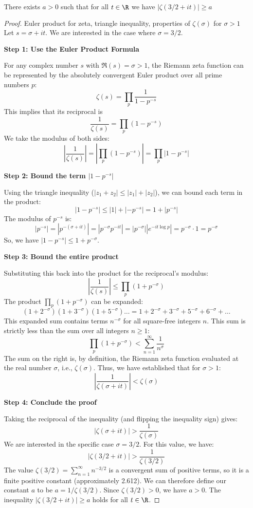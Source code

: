 \begin{lemma}\label{lem:zeta32lower}
\leanok
There exists $a>0$ such that for all $t\in\R$ we have $|\zeta(3/2+it)| \ge a$
\end{lemma}
\begin{proof}
\leanok
{}
Euler product for zeta, triangle inequality, properties of $\zeta(\sigma)$ for $\sigma>1$
Let $s = \sigma + it$. We are interested in the case where $\sigma = 3/2$.

\textbf{Step 1: Use the Euler Product Formula}

For any complex number $s$ with $\Re(s) = \sigma > 1$, the Riemann zeta function can be represented by the absolutely convergent Euler product over all prime numbers $p$:
$$ \zeta(s) = \prod_{p} \frac{1}{1-p^{-s}} $$
This implies that its reciprocal is
$$ \frac{1}{\zeta(s)} = \prod_{p} (1-p^{-s}) $$
We take the modulus of both sides:
$$ \left|\frac{1}{\zeta(s)}\right| = \left|\prod_{p} (1-p^{-s})\right| = \prod_{p} |1-p^{-s}| $$

\textbf{Step 2: Bound the term $|1-p^{-s}|$}

Using the triangle inequality ($|z_1+z_2| \le |z_1|+|z_2|$), we can bound each term in the product:
$$ |1 - p^{-s}| \le |1| + |-p^{-s}| = 1 + |p^{-s}| $$
The modulus of $p^{-s}$ is:
$$ |p^{-s}| = |p^{-(\sigma+it)}| = |p^{-\sigma} p^{-it}| = |p^{-\sigma}| |e^{-it\log p}| = p^{-\sigma} \cdot 1 = p^{-\sigma} $$
So, we have $|1-p^{-s}| \le 1+p^{-\sigma}$.

\textbf{Step 3: Bound the entire product}

Substituting this back into the product for the reciprocal's modulus:
$$ \left|\frac{1}{\zeta(s)}\right| \le \prod_{p} (1+p^{-\sigma}) $$
The product $\prod_{p} (1+p^{-\sigma})$ can be expanded:
$$ (1+2^{-\sigma})(1+3^{-\sigma})(1+5^{-\sigma})\dots = 1 + 2^{-\sigma} + 3^{-\sigma} + 5^{-\sigma} + 6^{-\sigma} + \dots $$
This expanded sum contains terms $n^{-\sigma}$ for all square-free integers $n$. This sum is strictly less than the sum over all integers $n \ge 1$:
$$ \prod_{p} (1+p^{-\sigma}) < \sum_{n=1}^\infty \frac{1}{n^\sigma} $$
The sum on the right is, by definition, the Riemann zeta function evaluated at the real number $\sigma$, i.e., $\zeta(\sigma)$.
Thus, we have established that for $\sigma > 1$:
$$ \left|\frac{1}{\zeta(\sigma+it)}\right| < \zeta(\sigma) $$

\textbf{Step 4: Conclude the proof}

Taking the reciprocal of the inequality (and flipping the inequality sign) gives:
$$ |\zeta(\sigma+it)| > \frac{1}{\zeta(\sigma)} $$
We are interested in the specific case $\sigma = 3/2$. For this value, we have:
$$ |\zeta(3/2+it)| > \frac{1}{\zeta(3/2)} $$
The value $\zeta(3/2) = \sum_{n=1}^\infty n^{-3/2}$ is a convergent sum of positive terms, so it is a finite positive constant (approximately 2.612).
We can therefore define our constant $a$ to be $a = 1/\zeta(3/2)$. Since $\zeta(3/2)>0$, we have $a>0$. The inequality $|\zeta(3/2+it)| \ge a$ holds for all $t \in \R$.
\end{proof}


